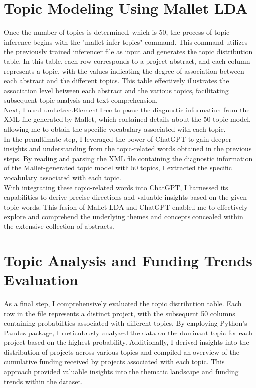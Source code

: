 \section*{Topic Modeling Using Mallet LDA}
Once the number of topics is determined, which is 50, the process of topic inference begins with the "mallet infer-topics" command. This command utilizes the previously trained inferencer file as input and generates the topic distribution table. In this table, each row corresponds to a project abstract, and each column represents a topic, with the values indicating the degree of association between each abstract and the different topics. This table effectively illustrates the association level between each abstract and the various topics, facilitating subsequent topic analysis and text comprehension.\\

Next, I used xml.etree.ElementTree to parse the diagnostic information from the XML file generated by Mallet, which contained details about the 50-topic model, allowing me to obtain the specific vocabulary associated with each topic.\\

In the penultimate step, I leveraged the power of ChatGPT to gain deeper insights and understanding from the topic-related words obtained in the previous steps. By reading and parsing the XML file containing the diagnostic information of the Mallet-generated topic model with 50 topics, I extracted the specific vocabulary associated with each topic.\\

With integrating these topic-related words into ChatGPT, I harnessed its capabilities to derive precise directions and valuable insights based on the given topic words. This fusion of Mallet LDA and ChatGPT enabled me to effectively explore and comprehend the underlying themes and concepts concealed within the extensive collection of abstracts.\\

\section*{Topic Analysis and Funding Trends Evaluation}
As a final step, I comprehensively evaluated the topic distribution table. Each row in the file represents a distinct project, with the subsequent 50 columns containing probabilities associated with different topics. By employing Python's Pandas package, I meticulously analyzed the data on the dominant topic for each project based on the highest probability. Additionally, I derived insights into the distribution of projects across various topics and compiled an overview of the cumulative funding received by projects associated with each topic. This approach provided valuable insights into the thematic landscape and funding trends within the dataset.


